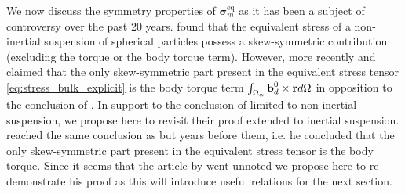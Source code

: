 We now discuss the symmetry properties of $\bm\sigma^\text{eq}_m$ as it has been a subject of controversy over the past 20 years.
\citet{prosperetti2006stress} found that the equivalent stress of a non-inertial suspension of spherical particles possess a skew-symmetric contribution (excluding the torque or the body torque term). 
However, more recently \citet{zhou2020lamb} and \citet{dolata2020heterogeneous} claimed that the only skew-symmetric part present in the equivalent stress tensor \eqref{eq:stress_bulk_explicit} is the body torque term $\int_{\Omega_{\alpha}} \textbf{b}_d^0 \times \textbf{r} d\Omega$ in opposition to the conclusion of \citep{prosperetti2006stress}.
In support to the conclusion of  \citet{dolata2020heterogeneous} limited to non-inertial suspension, we propose here to revisit their proof extended to inertial suspension. 
\citet{lhuillier1996contribution} reached the same conclusion as \citet{dolata2020heterogeneous} but years before them, i.e. he concluded that the only skew-symmetric part present in the equivalent stress tensor is the body torque. 
Since it seems that the article by \citet{lhuillier1996contribution} went unnoted we propose here to re-demonstrate his proof as this will introduce useful relations for the next section. 

